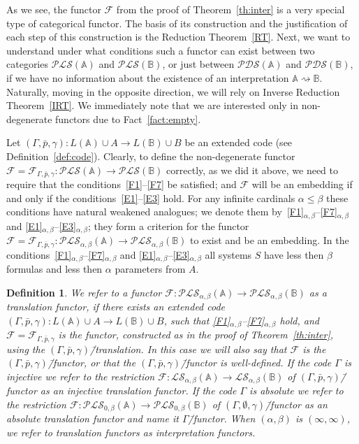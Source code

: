 \documentclass[12pt]{article}
\newtheorem{definition}{Definition}
\theoremstyle{definition}
\def\MA{{\mathbb{A}}}
\def\MB{{\mathbb{B}}}
\def\F{{\mathcal{F}}}
\def\PLS{{\mathcal{PLS}}}
\def\PDS{{\mathcal{PDS}}}
\def\LS{{\mathcal{LS}}}
\begin{document}
As we see, the functor $\F$ from the proof of Theorem~\ref{th:inter} is a very special type of categorical functor. The basis of its construction and the justification of each step of this construction is the Reduction Theorem~\ref{RT}. Next, we want to understand under what conditions such a functor can exist between two categories $\PLS(\MA)$ and $\PLS(\MB)$, or just between $\PDS(\MA)$ and $\PDS(\MB)$, if we have no information about the existence of an interpretation $\MA\rightsquigarrow\MB$. Naturally, moving in the opposite direction, we will rely on Inverse Reduction Theorem~\ref{IRT}. We immediately note that we are interested only in non-degenerate functors due to
 Fact~\ref{fact:empty}. 

Let $(\Gamma,\bar p,\gamma)\colon L(\MA)\cup A\to L(\MB)\cup B$ be an extended code (see Definition~\ref{def:code}). 
Clearly, to define the non-degenerate functor $\F=\F_{\Gamma,\bar p,\gamma}\colon \PLS(\MA)\to \PLS(\MB)$ correctly, as we did it above, we need to require that the conditions~\ref{F1}--\ref{F7} be satisfied; and $\F$ will be an embedding if and only if the conditions~\ref{E1}--\ref{E3} hold. For any infinite cardinals $\alpha\leqslant\beta$ these conditions have natural weakened analogues; we denote them by~\ref{F1}$_{\alpha,\beta}$--\ref{F7}$_{\alpha,\beta}$ and \ref{E1}$_{\alpha,\beta}$--\ref{E3}$_{\alpha,\beta}$; they form a criterion for the functor $\F=\F_{\Gamma,\bar p,\gamma}\colon \PLS_{\alpha,\beta}(\MA)\to \PLS_{\alpha,\beta}(\MB)$ to exist and be an embedding. In the conditions~\ref{F1}$_{\alpha,\beta}$--\ref{F7}$_{\alpha,\beta}$ and \ref{E1}$_{\alpha,\beta}$--\ref{E3}$_{\alpha,\beta}$ all systems $S$ have less then $\beta$ formulas and less then $\alpha$ parameters from $A$. 

\begin{definition}
We refer to a functor $\F\colon \PLS_{\alpha,\beta}(\MA)\to \PLS_{\alpha,\beta}(\MB)$ as a {\em translation functor}, if there exists an extended code $(\Gamma,\bar p,\gamma)\colon L(\MA)\cup A\to L(\MB)\cup B$, such that \ref{F1}$_{\alpha,\beta}$--\ref{F7}$_{\alpha,\beta}$ hold, and $\F=\F_{\Gamma,\bar p,\gamma}$ is the functor, constructed as in the proof of Theorem~\ref{th:inter}, using the $(\Gamma,\bar p,\gamma)$\=/translation. In this case we will also say that $\F$ is the $(\Gamma,\bar p,\gamma)$\=/functor, or that the $(\Gamma,\bar p,\gamma)$\=/functor is well-defined. If the code $\Gamma$ is injective we refer to the restriction $\F\colon \LS_{\alpha,\beta}(\MA)\to \LS_{\alpha,\beta}(\MB)$ of $(\Gamma,\bar p,\gamma)$\=/functor as an {\em injective translation functor}. If the code $\Gamma$ is absolute we refer to the restriction $\F\colon \PLS_{0,\beta}(\MA)\to \PLS_{0,\beta}(\MB)$ of $(\Gamma,\emptyset,\gamma)$\=/functor as an {\em absolute translation functor} and name it {\em $\Gamma$\=/functor}. When $(\alpha,\beta)$ is $(\infty,\infty)$, we refer to translation functors as {\em interpretation functors}.
\end{definition}
\end{document}
